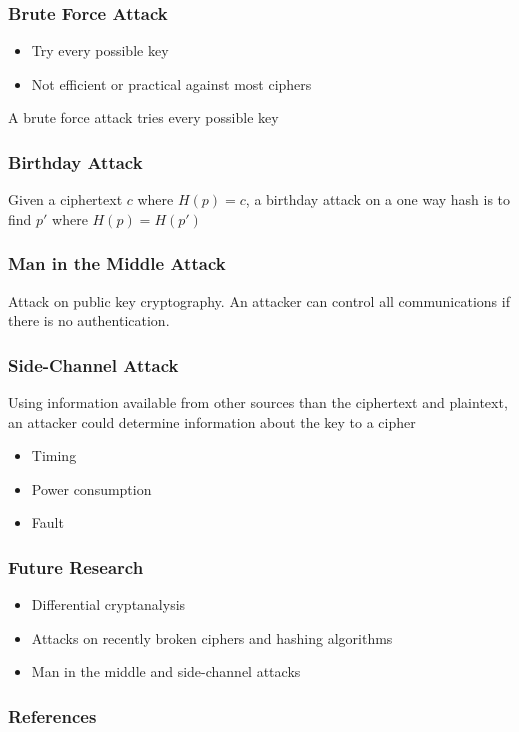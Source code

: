 \documentclass[12pt]{beamer}
\begin{document}
\begin{frame}
	\frametitle{Brute Force Attack}
	\begin{itemize}
		\item Try every possible key
		\item Not efficient or practical against most ciphers
	\end{itemize}
	A brute force attack tries every possible key
\end{frame}

\begin{frame}
	\frametitle{Birthday Attack}
	Given a ciphertext $c$ where $H(p)=c$, a birthday attack on a one way hash is to find $p'$ where $H(p)=H(p')$ \cite{appcrypt}
\end{frame}

\begin{frame}
	\frametitle{Man in the Middle Attack}
	Attack on public key cryptography. An attacker can control all communications if there is no authentication.
\end{frame}

\begin{frame}
	\frametitle{Side-Channel Attack}
	Using information available from other sources than the ciphertext and plaintext, an attacker could determine information about the key to a cipher
	\begin{itemize}
		\item Timing
		\item Power consumption
		\item Fault
	\end{itemize}
\end{frame}

\begin{frame}
	\frametitle{Future Research}
	\begin{itemize}
		\item Differential cryptanalysis
		\item Attacks on recently broken ciphers and hashing algorithms
		\item Man in the middle and side-channel attacks
	\end{itemize}
\end{frame}

\begin{frame}[allowframebreaks]
	\frametitle{References}
	\nocite{absalg}
	\nocite{appcrypt}
	\nocite{codebook}
	\nocite{compsec}
	\nocite{diffiehellman}
	\nocite{flushreload}
	\nocite{sidechannel}
	
	
\end{frame}
\end{document}
